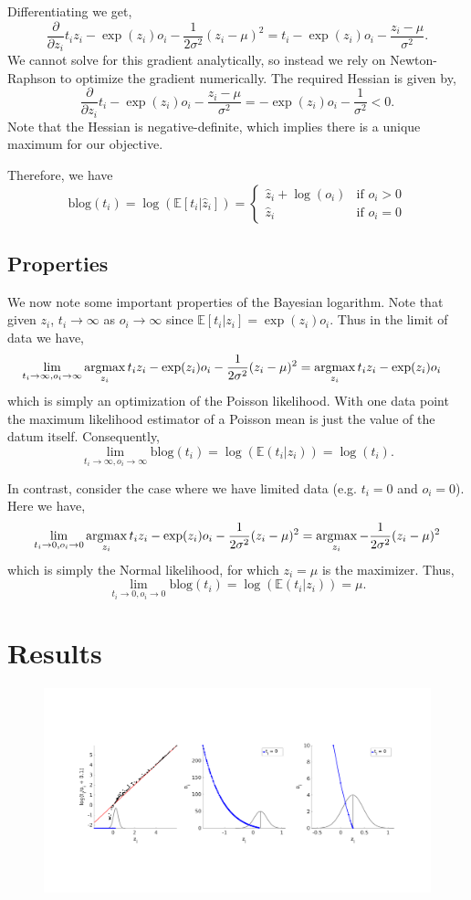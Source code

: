\documentclass[11pt]{article}
\newcommand{\argmax}{\operatornamewithlimits{argmax}}
\begin{document}
Differentiating we get, 
\[
\frac{\partial}{\partial z_i} t_i z_i - \exp(z_i)o_i -\frac{1}{2\sigma^2}(z_i - \mu)^2 = t_i - \exp(z_i)o_i -\frac{z_i - \mu}{\sigma^2}.
\]
We cannot solve for this gradient analytically, so instead we rely on Newton-Raphson to optimize the gradient numerically. The required Hessian is given by,
\[
\frac{\partial}{\partial z_i} t_i - \exp(z_i)o_i -\frac{z_i - \mu}{\sigma^2} = - \exp(z_i)o_i -\frac{1}{\sigma^2} < 0 .
\]
Note that the Hessian is negative-definite, which implies there is a unique maximum for our objective.  

Therefore, we have 
\[
\textrm{blog}(t_i) = \log(\mathbb{E}[t_i|\hat{z}_i]) = 
\begin{cases}
\hat{z}_i + \log(o_i) & \mbox{if } o_i > 0 \\
\hat{z}_i  & \mbox{if } o_i = 0
\end{cases}
\]

\subsection{Properties}

We now note some important properties of the Bayesian logarithm. Note that given $z_i$, $t_i \rightarrow \infty$ as $o_i \rightarrow \infty$ since $\mathbb{E}[t_i|z_i] = \exp(z_i)o_i$. Thus in the limit of data we have, 
\begin{align*}
&  \lim_{t_i \to \infty, o_i \to \infty} \argmax_{z_i} t_i z_i - \exp(z_i)o_i -\frac{1}{2\sigma^2}(z_i - \mu)^2 = \argmax_{z_i} t_i z_i - \exp(z_i)o_i
\end{align*}
which is simply an optimization of the Poisson likelihood. With one data point the maximum likelihood estimator of a Poisson mean is just the value of the datum itself. Consequently, 
\[
\lim_{t_i \to \infty,o_i \to \infty}\textrm{blog}(t_i) = \log(\mathbb{E}(t_i|z_i)) = \log(t_i).   
\]

In contrast, consider the case where we have limited data (e.g. $t_i = 0$ and $o_i = 0$). Here we have, 
\[
\lim_{t_i \to 0, o_i \to 0} \argmax_{z_i} t_i z_i - \exp(z_i)o_i -\frac{1}{2\sigma^2}(z_i - \mu)^2 = \argmax_{z_i} -\frac{1}{2\sigma^2}(z_i - \mu)^2
\]
which is simply the Normal likelihood, for which $z_i = \mu$ is the maximizer. Thus,
\[
\lim_{t_i \to 0,o_i \to 0}\textrm{blog}(t_i) = \log(\mathbb{E}(t_i|z_i)) = \mu.   
\]

\section{Results}

\begin{figure}[h]
\centering
\includegraphics[trim={1cm 6cm 1cm 7cm},clip,width=\textwidth]{figure1.png}
\caption{}
\end{figure}
\end{document}
